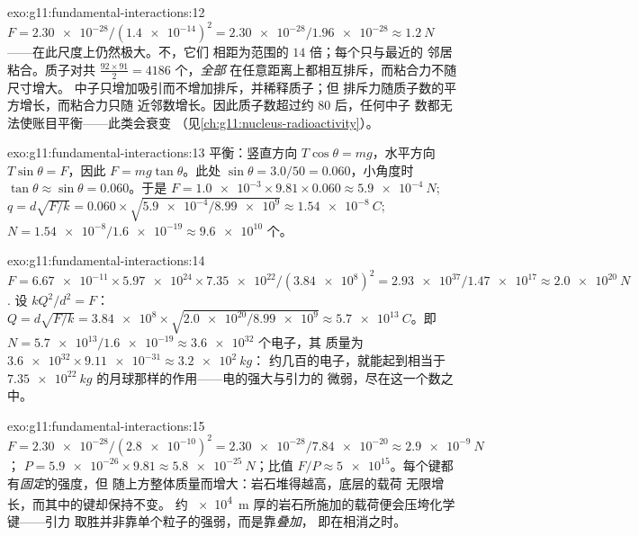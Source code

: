 \begin{solution}{exo:g11:fundamental-interactions:12}
$F = \num{2.30e-28}/(\num{1.4e-14})^2 = \num{2.30e-28}/\num{1.96e-28}
\approx \qty{1.2}{N}$ ——在此尺度上仍然极大。不，它们
相距为范围的 $14$ 倍；每个只与最近的
邻居粘合。质子对共 $\frac{92 \times 91}{2} = 4186$ 个，\emph{全部}
在任意距离上都相互排斥，而粘合力不随尺寸增大。
中子只增加吸引而不增加排斥，并稀释质子；但
排斥力随质子数的平方增长，而粘合力只随
近邻数增长。因此质子数超过约 $80$ 后，任何中子
数都无法使账目平衡——此类会衰变
（见\cref{ch:g11:nucleus-radioactivity}）。
\end{solution}

\begin{solution}{exo:g11:fundamental-interactions:13}
平衡：竖直方向 $T\cos\theta = mg$，水平方向
$T\sin\theta = F$，因此 $F = mg\tan\theta$。此处
$\sin\theta = 3.0/50 = 0.060$，小角度时
$\tan\theta \approx \sin\theta = 0.060$。于是
$F = \num{1.0e-3} \times 9.81 \times 0.060 \approx \qty{5.9e-4}{N}$;
$q = d\sqrt{F/k} = 0.060 \times \sqrt{\num{5.9e-4}/\num{8.99e9}}
\approx \qty{1.54e-8}{C}$; $N = \num{1.54e-8}/\num{1.6e-19} \approx
\num{9.6e10}$ 个。
\end{solution}

\begin{solution}{exo:g11:fundamental-interactions:14}
$F = \num{6.67e-11} \times \num{5.97e24} \times \num{7.35e22} /
(\num{3.84e8})^2 = \num{2.93e37}/\num{1.47e17} \approx \qty{2.0e20}{N}$.
设 $kQ^2/d^2 = F$：
$Q = d\sqrt{F/k} = \num{3.84e8} \times \sqrt{\num{2.0e20}/\num{8.99e9}}
\approx \qty{5.7e13}{C}$。即
$N = \num{5.7e13}/\num{1.6e-19} \approx \num{3.6e32}$ 个电子，其
质量为 $\num{3.6e32} \times \num{9.11e-31} \approx \qty{3.2e2}{kg}$：
约几百的电子，就能起到相当于
$\qty{7.35e22}{kg}$ 的月球那样的作用——电的强大与引力的
微弱，尽在这一个数之中。
\end{solution}

\begin{solution}{exo:g11:fundamental-interactions:15}
$F = \num{2.30e-28}/(\num{2.8e-10})^2 = \num{2.30e-28}/\num{7.84e-20}
\approx \qty{2.9e-9}{N}$；
$P = \num{5.9e-26} \times 9.81 \approx \qty{5.8e-25}{N}$；比值
$F/P \approx \num{5e15}$。每个键都有\emph{固定}的强度，但
随上方整体质量而增大：岩石堆得越高，底层的载荷
无限增长，而其中的键却保持不变。
约 \qty{e4}{m} 厚的岩石所施加的载荷便会压垮化学键——引力
取胜并非靠单个粒子的强弱，而是靠\emph{叠加}，
即在相消之时。
\end{solution}

